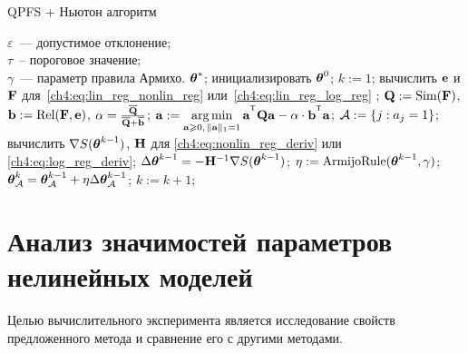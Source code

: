 \begin{algorithm}[ht]
	\caption{QPFS + Ньютон алгоритм}
	\label{ch4:alg:QPFSNewton}
	\begin{algorithmic}
		\REQUIRE $\varepsilon$~--- допустимое отклонение;\\
		\hspace{1.07cm}$\tau$~-- пороговое значение;\\
		\hspace{1.07cm}$\gamma$~--- параметр правила Армихо.
		\ENSURE $\boldsymbol{\theta}^*$;
		\STATE  инициализировать $\boldsymbol{\theta}^0$;
		\STATE $k := 1$;
		\REPEAT
		\STATE вычислить $\mathbf{e}$ и $\mathbf{F}$ для~\eqref{ch4:eq:lin_reg_nonlin_reg} или~\eqref{ch4:eq:lin_reg_log_reg} ;
		\vspace{0.1cm}
		\STATE $\mathbf{Q} := \text{Sim} (\mathbf{F})$, $\mathbf{b} := \text{Rel}(\mathbf{F}, \mathbf{e})$, $\alpha = \frac{\overline{\mathbf{Q}}}{\overline{\mathbf{Q}} + \overline{\mathbf{b}}}$;
		\vspace{0.1cm}
		\STATE $\ba := \argmin_{\ba \geq 0, \, \|\ba\|_1=1}\ba^{\T} \bQ \ba - \alpha \cdot \mathbf{b}^{\T} \ba$;
		\vspace{0.1cm}
		\STATE $\mathcal{A} := \{j: a_j = 1\}$;
		\vspace{0.1cm}
		\STATE вычислить $\nabla S(\boldsymbol{\theta}^{k-1})$, $\mathbf{H}$ для \eqref{ch4:eq:nonlin_reg_deriv} или \eqref{ch4:eq:log_reg_deriv};
		\vspace{0.1cm}
		\STATE $\Delta \boldsymbol{\theta}^{k-1} = - \mathbf{H}^{-1} \nabla S(\boldsymbol{\theta}^{k-1})$;
		\vspace{0.1cm}
		\STATE $\eta := \text{ArmijoRule}(\boldsymbol{\theta}^{k-1}, \gamma)$;
		\vspace{0.1cm}
		\STATE $\boldsymbol{\theta}_{\mathcal{A}}^k = \boldsymbol{\theta}_{\mathcal{A}}^{k - 1} + \eta \Delta \boldsymbol{\theta}_{\mathcal{A}}^{k - 1}$;
		\vspace{0.1cm}
		\STATE $k := k + 1$;
		\vspace{0.1cm}
	\end{algorithmic}
\end{algorithm}

\section{Анализ значимостей параметров нелинейных моделей}
\label{sec:ch4:newton_qpfs_exp}

Целью вычислительного эксперимента является исследование свойств предложенного метода и сравнение его с другими методами. 

